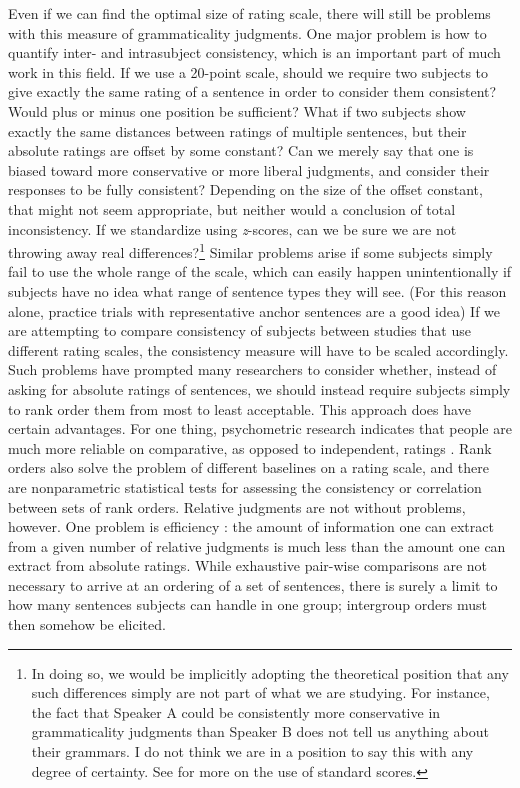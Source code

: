  Even if we can find the optimal size of rating scale, there will still be problems with this measure of grammaticality judgments. One major problem is how to quantify inter- and intrasubject consistency, which is an important part of much work in this field. If we use a 20-point scale, should we require two subjects to give exactly the same rating of a sentence in order to consider them consistent? Would plus or minus one position be sufficient? What if two subjects show exactly the same distances between ratings of multiple sentences, but their absolute ratings are offset by some constant? Can we merely say that one is biased toward more conservative or more liberal judgments, and consider their responses to be fully consistent? Depending on the size of the offset constant, that might not seem appropriate, but neither would a conclusion of total inconsistency. If we standardize using \textit{z}-scores, can we be sure we are not throwing away real differences?\footnote{In doing so, we would be implicitly adopting the theoretical position that any such differences simply are not part of what we are studying. For instance, the fact that Speaker A could be consistently more conservative in grammaticality judgments than Speaker B does not tell us anything about their grammars. I do not think we are in a position to say this with any degree of certainty. See \citet[13\textendash{}14, 114]{Cowart1997} for more on the use of standard scores.}
 Similar problems arise if some subjects simply fail to use the whole range of the scale, which can easily happen unintentionally if subjects have no idea what range of sentence types they will see. (For this reason alone, practice trials with representative anchor sentences are a good idea) If we are attempting to compare consistency  of subjects between  studies that use different rating
scales, the consistency measure will have to be scaled accordingly. Such problems have prompted many researchers to consider whether, instead of asking for absolute ratings of sentences, we should instead require subjects simply to rank order them from most to least acceptable. This approach does have certain advantages. For one thing, psychometric research indicates that people are much more reliable on comparative, as opposed to independent, ratings \citep{Mohan1977}. Rank orders also solve the problem of different baselines on a rating scale, and there are nonparametric statistical tests for assessing the consistency or correlation between sets of rank orders. Relative judgments are not without problems, however. One problem is efficiency \citep{MaclayEtAl1960}: the amount of information one can extract from a given number of relative judgments is much less than the amount one can extract from absolute ratings. While exhaustive pair-wise comparisons are not necessary to arrive at an ordering of a set of sentences, there is surely a limit to how many sentences subjects can handle in one group; intergroup orders must then somehow be elicited.

